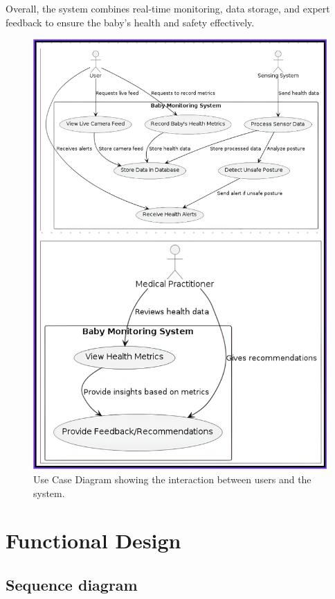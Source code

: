 \documentclass[12pt,a4paper]{report}
\begin{document}
Overall, the system combines real-time monitoring, data storage, and expert feedback to ensure the baby’s health and safety effectively.

\begin{figure}[hbtp]
  \centering
  \includegraphics[scale=0.9]{./pic/Use case.png}
  \caption{Use Case Diagram showing the interaction between users and the system.}
  \label{fig:usecase}
\end{figure}
\section{Functional Design}
\subsection{Sequence diagram}
\end{document}
